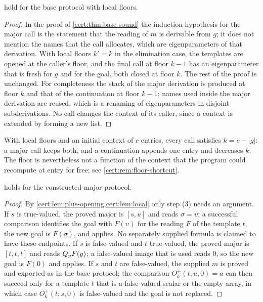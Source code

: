 \begin{lemma}\label{cert:lem:local}
 hold for the base protocol
with local floors.
\end{lemma}
\begin{proof}
In the proof of \cref{cert:thm:base-sound} the induction hypothesis for the
major call is the statement that the reading of $m$ is derivable from $g$; it
does not mention the names that the call allocates, which are eigenparameters
of that derivation. With local floors $k'=k$ in the elimination case, the
templates are opened at the caller's floor, and the final call at floor $k-1$
has an eigenparameter that is fresh for $g$ and for the goal, both closed at
floor $k$. The rest of the proof is unchanged. For completeness the stack of
the major derivation is produced at floor $k$ and that of the continuation at
floor $k-1$; names used inside the major derivation are reused, which is a
renaming of eigenparameters in disjoint subderivations. No call changes the
context of its caller, since a context is extended by forming a new list.
\end{proof}

With local floors and an initial context of $c$ entries, every call satisfies
$k=c-\lvert g\rvert$: a major call keeps both, and a continuation appends one
entry and decreases $k$. The floor is nevertheless not a function of the
context that the program could recompute at entry for free; see
\cref{cert:rem:floor-shortcut}.

\begin{proposition}\label{cert:prop:constructed}
 holds for the constructed-major protocol.
\end{proposition}
\begin{proof}
By \cref{cert:lem:plus-opening,cert:lem:local} only step (3) needs an
argument. If $s$ is true-valued, the proved major is $[s,u]$ and reads
$\sigma=\upsilon$; a successful comparison identifies the goal with
$F(\upsilon)$ for the reading $F$ of the template $t$, the new goal is
$F(\sigma)$, and  applies. No separately supplied formula is
claimed to have these endpoints. If $s$ is false-valued and $t$ true-valued,
the proved major is $[t,t,t]$ and reads $Q_{y}F(y)$; a false-valued image that
is used reads $0$, so the new goal is $F(0)$ and  applies. If $s$
and $t$ are false-valued, the supplied $m$ is proved and exported as in the
base protocol; the comparison $O^{+}_k(t;u,0)=a$ can then succeed only for a
template $t$ that is a false-valued scalar or the empty array, in which case
$O^{+}_k(t;s,0)$ is false-valued and the goal is not replaced.
\end{proof}


